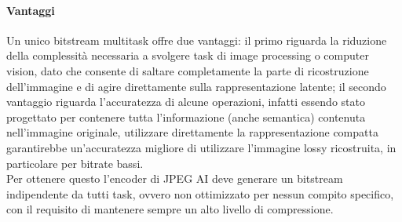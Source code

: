 \paragraph{Vantaggi}Un unico bitstream multitask offre due vantaggi: il primo riguarda la riduzione della complessità necessaria a svolgere task di image processing o computer vision, dato che consente di saltare completamente la parte di ricostruzione dell'immagine e di agire direttamente sulla rappresentazione latente; il secondo vantaggio riguarda l'accuratezza di alcune operazioni, infatti essendo stato progettato per contenere tutta l'informazione (anche semantica) contenuta nell'immagine originale, utilizzare direttamente la rappresentazione compatta garantirebbe un'accuratezza migliore di utilizzare l'immagine lossy ricostruita, in particolare per bitrate bassi.\\
Per ottenere questo l'encoder di JPEG AI deve generare un bitstream indipendente da tutti task, ovvero non ottimizzato per nessun compito specifico, con il requisito di mantenere sempre un alto livello di compressione.
